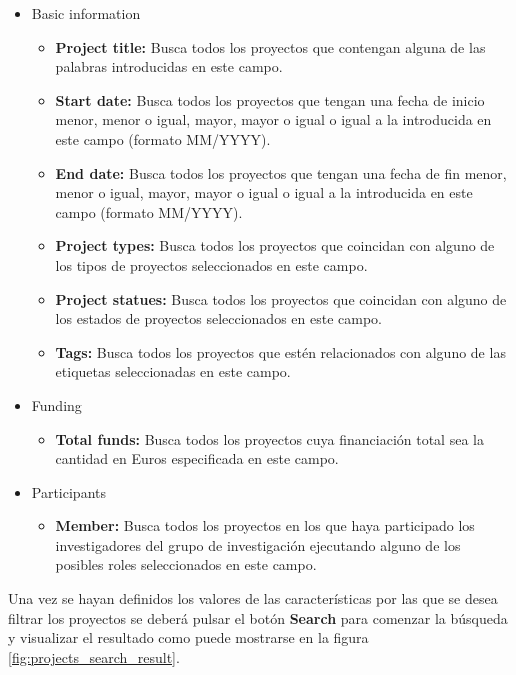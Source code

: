 \begin{itemize}
	\item Basic information
	\begin{itemize}
		\item \textbf{Project title:} Busca todos los proyectos que contengan alguna de las palabras introducidas en este campo.
		\item \textbf{Start date:} Busca todos los proyectos que tengan una fecha de inicio menor, menor o igual, mayor, mayor o igual o igual a la introducida en este campo (formato MM/YYYY).
		\item \textbf{End date:} Busca todos los proyectos que tengan una fecha de fin menor, menor o igual, mayor, mayor o igual o igual a la introducida en este campo (formato MM/YYYY).
		\item \textbf{Project types:} Busca todos los proyectos que coincidan con alguno de los tipos de proyectos seleccionados en este campo.
		\item \textbf{Project statues:} Busca todos los proyectos que coincidan con alguno de los estados de proyectos seleccionados en este campo.
		\item \textbf{Tags:} Busca todos los proyectos que estén relacionados con alguno de las etiquetas seleccionadas en este campo.
	\end{itemize}
	\item Funding
	\begin{itemize}
		\item \textbf{Total funds:} Busca todos los proyectos cuya financiación total sea la cantidad en Euros especificada en este campo.
	\end{itemize}
	\item Participants
	\begin{itemize}
		\item \textbf{Member:} Busca todos los proyectos en los que haya participado los investigadores del grupo de investigación ejecutando alguno de los posibles roles seleccionados en este campo.
	\end{itemize}
\end{itemize}

Una vez se hayan definidos los valores de las características por las que se desea filtrar los proyectos se deberá pulsar el botón \textbf{Search} para comenzar la búsqueda y visualizar el resultado como puede mostrarse en la figura \ref{fig:projects_search_result}.

